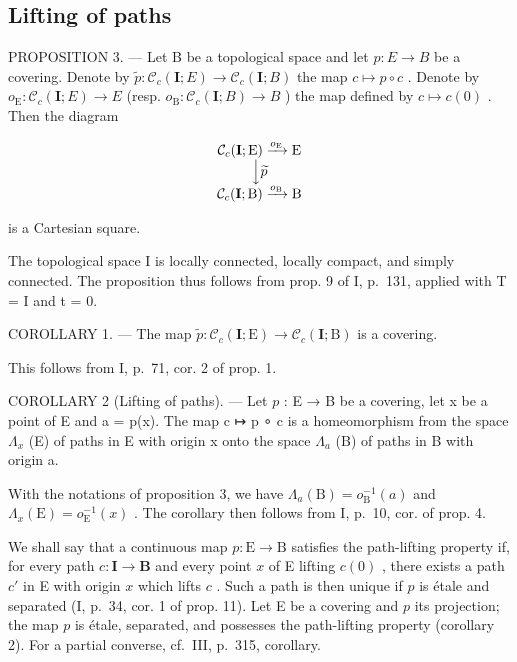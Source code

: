 \subsection{Lifting of paths}

PROPOSITION 3. --- Let B be a topological space and let \(p\colon E \to B\) be a covering. Denote by \(\widetilde{p}\colon \mathcal{C}_{c}(\mathbf{I};E) \to \mathcal{C}_{c}(\mathbf{I};B)\) the map \(c \mapsto p \circ c\) . Denote by \(o_{\mathrm{E}}\colon \mathcal{C}_{c}(\mathbf{I};E) \to E\) (resp. \(o_{\mathrm{B}}\colon \mathcal{C}_{c}(\mathbf{I};B) \to B\) ) the map defined by \(c \mapsto c(0)\) . Then the diagram

\[
\begin{array}{c} \mathcal {C} _ {c} (\mathbf {I}; \mathrm{E}) \xrightarrow {o _ {\mathrm{E}}} \mathrm{E} \\ \Big \downarrow \widetilde {p} \\ \mathcal {C} _ {c} (\mathbf {I}; \mathrm{B}) \xrightarrow {o _ {\mathrm{B}}} \mathrm{B} \end{array}
\]

is a Cartesian square.

The topological space I is locally connected, locally compact, and simply connected. The proposition thus follows from prop. 9 of I, p.~131, applied with T = I and t = 0.

COROLLARY 1. --- The map \(\widetilde{p}\colon\mathcal{C}_{c}(\mathbf{I};\mathrm{E})\to\mathcal{C}_{c}(\mathbf{I};\mathrm{B})\) is a covering.

This follows from I, p.~71, cor. 2 of prop. 1.

COROLLARY 2 (Lifting of paths). --- Let \(p\) : E → B be a covering, let x be a point of E and a = p(x). The map c ↦ p ∘ c is a homeomorphism from the space \(\Lambda_x\) (E) of paths in E with origin x onto the space \(\Lambda_a\) (B) of paths in B with origin a.

With the notations of proposition 3, we have \(\Lambda_{a}(\mathrm{B}) = o_{\mathrm{B}}^{-1}(a)\) and \(\Lambda_x(\mathrm{E}) = o_{\mathrm{E}}^{-1}(x)\) . The corollary then follows from I, p.~10, cor. of prop. 4.

We shall say that a continuous map \(p \colon \mathrm{E} \to \mathrm{B}\) satisfies the path-lifting property if, for every path \(c \colon \mathbf{I} \to \mathbf{B}\) and every point \(x\) of E lifting \(c(0)\) , there exists a path \(c'\) in E with origin \(x\) which lifts \(c\) . Such a path is then unique if \(p\) is étale and separated (I, p.~34, cor. 1 of prop. 11). Let E be a covering and \(p\) its projection; the map \(p\) is étale, separated, and possesses the path-lifting property (corollary 2). For a partial converse, cf.~III, p.~315, corollary.

